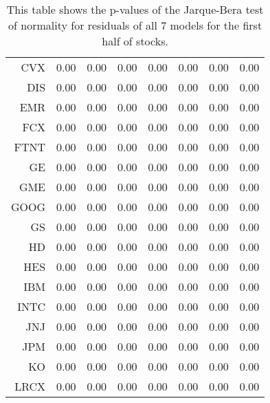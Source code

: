 \begin{table}[ht]
\begin{tabular}{rrrrrrrr}
  CVX & 0.00 & 0.00 & 0.00 & 0.00 & 0.00 & 0.00 & 0.00 \\ 
  DIS & 0.00 & 0.00 & 0.00 & 0.00 & 0.00 & 0.00 & 0.00 \\ 
  EMR & 0.00 & 0.00 & 0.00 & 0.00 & 0.00 & 0.00 & 0.00 \\ 
  FCX & 0.00 & 0.00 & 0.00 & 0.00 & 0.00 & 0.00 & 0.00 \\ 
  FTNT & 0.00 & 0.00 & 0.00 & 0.00 & 0.00 & 0.00 & 0.00 \\ 
  GE & 0.00 & 0.00 & 0.00 & 0.00 & 0.00 & 0.00 & 0.00 \\ 
  GME & 0.00 & 0.00 & 0.00 & 0.00 & 0.00 & 0.00 & 0.00 \\ 
  GOOG & 0.00 & 0.00 & 0.00 & 0.00 & 0.00 & 0.00 & 0.00 \\ 
  GS & 0.00 & 0.00 & 0.00 & 0.00 & 0.00 & 0.00 & 0.00 \\ 
  HD & 0.00 & 0.00 & 0.00 & 0.00 & 0.00 & 0.00 & 0.00 \\ 
  HES & 0.00 & 0.00 & 0.00 & 0.00 & 0.00 & 0.00 & 0.00 \\ 
  IBM & 0.00 & 0.00 & 0.00 & 0.00 & 0.00 & 0.00 & 0.00 \\ 
  INTC & 0.00 & 0.00 & 0.00 & 0.00 & 0.00 & 0.00 & 0.00 \\ 
  JNJ & 0.00 & 0.00 & 0.00 & 0.00 & 0.00 & 0.00 & 0.00 \\ 
  JPM & 0.00 & 0.00 & 0.00 & 0.00 & 0.00 & 0.00 & 0.00 \\ 
  KO & 0.00 & 0.00 & 0.00 & 0.00 & 0.00 & 0.00 & 0.00 \\ 
  LRCX & 0.00 & 0.00 & 0.00 & 0.00 & 0.00 & 0.00 & 0.00 \\ 
   \hline
\end{tabular}
\caption[p-values of Jarque-Bera test on model residuals (1)]{This table shows the p-values of the Jarque-Bera test of normality for residuals 
              of all 7 models for the first half of stocks.} 
\label{Table:JBresid_p_vals_1}
\end{table}
